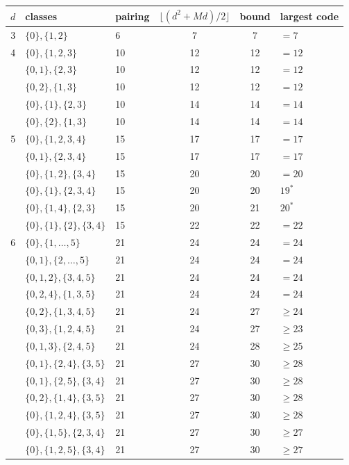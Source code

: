 \begin{table}[ht]
\centering\small
\begin{tabular}{@{}cllccl@{}}
\toprule
$d$ & classes & pairing & $\lfloor(d^2+Md)/2\rfloor$ & bound & largest code \\
\midrule
3 & $\{0\},\{1,2\}$ & 6 & 7 & 7 & $=7$ \\
\midrule
4 & $\{0\},\{1,2,3\}$ & 10 & 12 & 12 & $=12$ \\
  & $\{0,1\},\{2,3\}$ & 10 & 12 & 12 & $=12$ \\
  & $\{0,2\},\{1,3\}$ & 10 & 12 & 12 & $=12$ \\
  & $\{0\},\{1\},\{2,3\}$ & 10 & 14 & 14 & $=14$ \\
  & $\{0\},\{2\},\{1,3\}$ & 10 & 14 & 14 & $=14$ \\
\midrule
5 & $\{0\},\{1,2,3,4\}$ & 15 & 17 & 17 & $=17$ \\
  & $\{0,1\},\{2,3,4\}$ & 15 & 17 & 17 & $=17$ \\
  & $\{0\},\{1,2\},\{3,4\}$ & 15 & 20 & 20 & $=20$ \\
  & $\{0\},\{1\},\{2,3,4\}$ & 15 & 20 & 20 & $19^{*}$ \\
  & $\{0\},\{1,4\},\{2,3\}$ & 15 & 20 & 21 & $20^{*}$ \\
  & $\{0\},\{1\},\{2\},\{3,4\}$ & 15 & 22 & 22 & $=22$ \\
\midrule
6 & $\{0\},\{1,\dots,5\}$ & 21 & 24 & 24 & $=24$ \\
  & $\{0,1\},\{2,\dots,5\}$ & 21 & 24 & 24 & $=24$ \\
  & $\{0,1,2\},\{3,4,5\}$ & 21 & 24 & 24 & $=24$ \\
  & $\{0,2,4\},\{1,3,5\}$ & 21 & 24 & 24 & $=24$ \\
  & $\{0,2\},\{1,3,4,5\}$ & 21 & 24 & 27 & $\ge24$ \\
  & $\{0,3\},\{1,2,4,5\}$ & 21 & 24 & 27 & $\ge23$ \\
  & $\{0,1,3\},\{2,4,5\}$ & 21 & 24 & 28 & $\ge25$ \\
  & $\{0,1\},\{2,4\},\{3,5\}$ & 21 & 27 & 30 & $\ge28$ \\
  & $\{0,1\},\{2,5\},\{3,4\}$ & 21 & 27 & 30 & $\ge28$ \\
  & $\{0,2\},\{1,4\},\{3,5\}$ & 21 & 27 & 30 & $\ge28$ \\
  & $\{0\},\{1,2,4\},\{3,5\}$ & 21 & 27 & 30 & $\ge28$ \\
  & $\{0\},\{1,5\},\{2,3,4\}$ & 21 & 27 & 30 & $\ge27$ \\
  & $\{0\},\{1,2,5\},\{3,4\}$ & 21 & 27 & 30 & $\ge27$ \\

\end{tabular}
\end{table}
